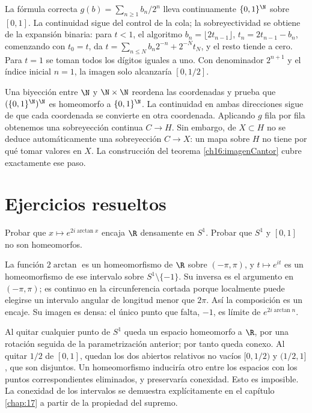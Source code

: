 \begin{observacion}
La fórmula correcta $g(b)=\sum_{n\ge1}b_n/2^n$ lleva continuamente $\{0,1\}^{\N}$ sobre $[0,1]$. La continuidad sigue del control de la cola; la sobreyectividad se obtiene de la expansión binaria: para $t<1$, el algoritmo $b_n=\lfloor2t_{n-1}\rfloor$, $t_n=2t_{n-1}-b_n$, comenzando con $t_0=t$, da $t=\sum_{n\le N}b_n2^{-n}+2^{-N}t_N$, y el resto tiende a cero. Para $t=1$ se toman todos los dígitos iguales a uno. Con denominador $2^{n+1}$ y el índice inicial $n=1$, la imagen solo alcanzaría $[0,1/2]$.

Una biyección entre $\N$ y $\N\times\N$ reordena las coordenadas y prueba que $(\{0,1\}^{\N})^{\N}$ es homeomorfo a $\{0,1\}^{\N}$. La continuidad en ambas direcciones sigue de que cada coordenada se convierte en otra coordenada. Aplicando $g$ fila por fila obtenemos una sobreyección continua $C\to H$. Sin embargo, de $X\subset H$ no se deduce automáticamente una sobreyección $C\to X$: un mapa sobre $H$ no tiene por qué tomar valores en $X$. La construcción del teorema \ref{ch16:imagenCantor} cubre exactamente ese paso.
\end{observacion}

\section{Ejercicios resueltos}
\begin{ejercicio}
Probar que $x\mapsto e^{2i\arctan x}$ encaja $\R$ densamente en $S^1$. Probar que $S^1$ y $[0,1]$ no son homeomorfos.
\end{ejercicio}
\begin{solucion}
La función $2\arctan$ es un homeomorfismo de $\R$ sobre $(-\pi,\pi)$, y $t\mapsto e^{it}$ es un homeomorfismo de ese intervalo sobre $S^1\setminus\{-1\}$. Su inversa es el argumento en $(-\pi,\pi)$; es continuo en la circunferencia cortada porque localmente puede elegirse un intervalo angular de longitud menor que $2\pi$. Así la composición es un encaje. Su imagen es densa: el único punto que falta, $-1$, es límite de $e^{2i\arctan n}$.

Al quitar cualquier punto de $S^1$ queda un espacio homeomorfo a $\R$, por una rotación seguida de la parametrización anterior; por tanto queda conexo. Al quitar $1/2$ de $[0,1]$, quedan los dos abiertos relativos no vacíos $[0,1/2)$ y $(1/2,1]$, que son disjuntos. Un homeomorfismo induciría otro entre los espacios con los puntos correspondientes eliminados, y preservaría conexidad. Esto es imposible. La conexidad de los intervalos se demuestra explícitamente en el capítulo \ref{chap:17} a partir de la propiedad del supremo.
\end{solucion}

